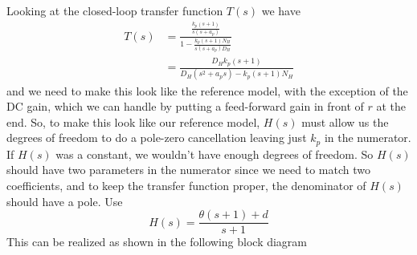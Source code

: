 \begin{figure}[H]
  \begin{center}
  \end{center}
\end{figure}
Looking at the closed-loop transfer function $T(s)$ we have
\begin{align*}
  T(s)&=\frac{\frac{k_{p}(s+1)}{s(s+a_{p})}}{1-\frac{k_{p}(s+1)N_{H}}{s(s+a_{p})D_{H}}} \\
  &=\frac{D_{H}k_{p}(s+1)}{D_{H}(s^{2}+a_{p}s)-k_{p}(s+1)N_{H}}
\end{align*}
and we need to make this look like the reference model, with the exception of the DC gain, which we can handle by putting a feed-forward gain in front of $r$ at the end.
So, to make this look like our reference model, $H(s)$ must allow us the degrees of freedom to do a pole-zero cancellation leaving just $k_{p}$ in the numerator.
If $H(s)$ was a constant, we wouldn't have enough degrees of freedom.
So $H(s)$ should have two parameters in the numerator since we need to match two coefficients, and to keep the transfer function proper, the denominator of $H(s)$ should have a pole.
Use
\begin{equation*}
  H(s)=\frac{\theta(s+1)+d}{s+1}
\end{equation*}
This can be realized as shown in the following block diagram
